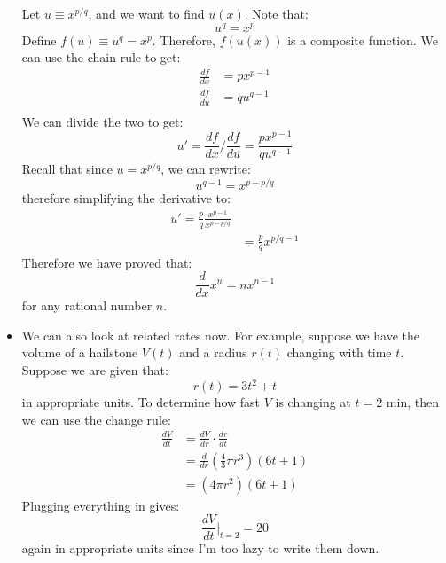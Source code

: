 \begin{itemize}
\begin{prooof}
        Let $u\equiv x^{p/q}$, and we want to find $u(x)$. Note that:
        \begin{equation}
            u^q=x^p
            \label{eq:}
        \end{equation}
        Define $f(u)\equiv u^q = x^p$. Therefore, $f(u(x))$ is a composite function. We can use the chain rule to get:
        \begin{align}
            \frac{df}{dx} &= px^{p-1} \\ 
            \frac{df}{du} &= qu^{q-1} \\ 
            \label{eq:}
        \end{align}
        We can divide the two to get:
        \begin{equation}
            u' = \frac{df}{dx} / \frac{df}{du} = \frac{px^{p-1}}{qu^{q-1}}
            \label{eq:}
        \end{equation}
        Recall that since $u=x^{p/q}$, we can rewrite:
        \begin{equation}
            u^{q-1} = x^{p-p/q}
            \label{eq:}
        \end{equation}
        therefore simplifying the derivative to:
        \begin{align}
            u'=\frac{p}{q} \frac{x^{p-1}}{x^{p-p/q}} \\ 
            &= \frac{p}{q} x^{p/q-1}
        \end{align}
        Therefore we have proved that:
        \begin{equation}
            \frac{d}{dx} x^n = nx^{n-1}
            \label{eq:}
        \end{equation}
        for any rational number $n$.
    \end{prooof}
    \item We can also look at related rates now. For example, suppose we have the volume of a hailstone $V(t)$ and a radius $r(t)$ changing with time $t$. Suppose we are given that:
    \begin{equation}
        r(t)=3t^2+t
        \label{eq:}
    \end{equation}
    in appropriate units. To determine how fast $V$ is changing at $t=2\text{ min}$, then we can use the change rule:
    \begin{align}
        \frac{dV}{dt} &= \frac{dV}{dr} \cdot \frac{dr}{dt} \\ 
        &= \frac{d}{dr}\left(\frac{4}{3}\pi r^3\right) (6t+1) \\ 
        &= (4\pi r^2)(6t+1)
        \label{eq:}
    \end{align}
    Plugging everything in gives:
    \begin{equation}
        \frac{dV}{dt}\biggr|_{t=2} = 20
        \label{eq:}
    \end{equation}
    again in appropriate units since I'm too lazy to write them down.
\end{itemize}